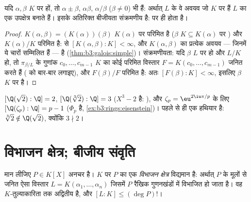 \begin{corollary}\label{cor:b3:galois:algclosed}
यदि $\alpha, \beta$ $K$ पर  हों, तो $\alpha \pm
\beta$, $\alpha\beta$, $\alpha/\beta$ ($\beta \ne 0$) भी
 हैं: अर्थात् $L$ के वे अवयव जो $K$ पर  हैं $L$
का एक उपक्षेत्र बनाते हैं। इसके अतिरिक्त बीजीयता संक्रमणीय है:
 पर   ही होता है।
\end{corollary}

\begin{proof}
$K(\alpha, \beta) = (K(\alpha))(\beta)$ $K(\alpha)$ पर परिमित है ($\beta$ $K \subseteq K(\alpha)$ पर ) और $K(\alpha)/K$ परिमित
है:  से $[K(\alpha,\beta):K] <
\infty$, और $K(\alpha, \beta)$ का प्रत्येक अवयव --- जिनमें ये
चारों सम्मिलित हैं ---  है (\cref{thm:b3:galois:simple})। संक्रमणीयता: यदि $\beta$
$L$ पर  हो और $L/K$  हो, तो $\pi_{\beta/L}$ के गुणांक $c_0, \dots, c_{m-1}$
$K$ का कोई परिमित विस्तार $F = K(c_0, \dots,
c_{m-1})$ जनित करते हैं ( को
बार-बार लगाइए), और $F(\beta)/F$ परिमित है: अतः $[F(\beta):K] < \infty$, इसलिए $\beta$
$K$ पर  है।
\end{proof}

\begin{example}\label{ex:b3:galois:degrees}
$[\Q(\sqrt2):\Q] = 2$, $[\Q(\sqrt[3]2):\Q] = 3$ ($X^3 - 2$  है: ), और $\zeta_p = \eu^{2\iu\pi/p}$ के लिए
$[\Q(\zeta_p):\Q] = p - 1$ ($\Phi_p$  है, \cref{ex:b3:rings:eisenstein})।  पहले से ही एक
हथियार है: $\sqrt[3]2 \notin \Q(\sqrt2)$, क्योंकि $3 \nmid 2$।
\end{example}

\section{विभाजन क्षेत्र; बीजीय संवृति}

\begin{theorem}[विभाजन क्षेत्र]\label{thm:b3:galois:splitting}
मान लीजिए $P \in K[X]$ अनचर है। $K$ पर $P$ का एक \emph{विभाजन
क्षेत्र} विद्यमान है: अर्थात् $P$ के
मूलों से जनित ऐसा विस्तार $L =
K(\alpha_1, \dots, \alpha_n)$ जिसमें $P$ रैखिक गुणनखंडों में
विभाजित हो जाता है। वह $K$-तुल्याकारिता तक अद्वितीय है, और
$[L:K] \leq (\deg P)!$।
\end{theorem}

